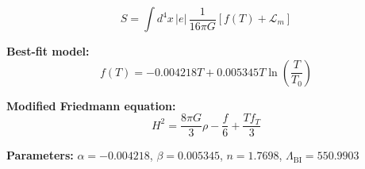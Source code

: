 
\begin{equation}
  S = \int d^4x \, |e| \, \frac{1}{16\pi G} \left[ f(T) + \mathcal{L}_m \right]
\end{equation}

\textbf{Best-fit model:}
\begin{equation}
  f(T) = -0.004218 T + 0.005345 T \ln\!\left(\frac{T}{T_0}\right)
\end{equation}

\textbf{Modified Friedmann equation:}
\begin{equation}
  H^2 = \frac{8\pi G}{3} \rho - \frac{f}{6} + \frac{T f_T}{3}
\end{equation}

\textbf{Parameters:}
$\alpha = -0.004218$, \quad
$\beta = 0.005345$, \quad
$n = 1.7698$, \quad
$\Lambda_{\text{BI}} = 550.9903$